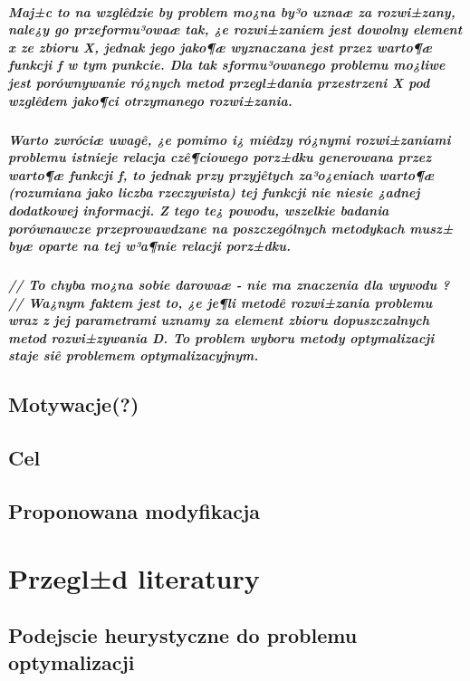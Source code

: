 \documentclass[11pt]{report}
\begin{document}
\paragraph{
Maj±c to na wzglêdzie by problem mo¿na by³o uznaæ za rozwi±zany, nale¿y go przeformu³owaæ tak, ¿e rozwi±zaniem jest dowolny element x ze zbioru X, jednak jego jako¶æ wyznaczana jest przez warto¶æ funkcji f w tym punkcie. Dla tak sformu³owanego problemu mo¿liwe jest porównywanie ró¿nych metod przegl±dania przestrzeni X pod wzglêdem jako¶ci otrzymanego rozwi±zania.
}
\paragraph{
Warto zwróciæ uwagê, ¿e pomimo i¿ miêdzy ró¿nymi rozwi±zaniami problemu istnieje relacja czê¶ciowego porz±dku generowana przez warto¶æ funkcji f, to jednak przy przyjêtych za³o¿eniach warto¶æ (rozumiana jako liczba rzeczywista) tej funkcji nie niesie ¿adnej dodatkowej informacji. Z tego te¿ powodu, wszelkie badania porównawcze przeprowawdzane na poszczególnych metodykach musz± byæ oparte na tej w³a¶nie relacji porz±dku.
}
\paragraph{
// To chyba mo¿na sobie darowaæ - nie ma znaczenia dla wywodu ?
// Wa¿nym faktem jest to, ¿e je¶li metodê rozwi±zania problemu wraz z jej parametrami uznamy za element zbioru dopuszczalnych metod rozwi±zywania D. To problem wyboru metody optymalizacji staje siê problemem optymalizacyjnym.
}

\section{Motywacje(?)}
\section{Cel}
\section{Proponowana modyfikacja} %

\chapter{Przegl±d literatury}
\section{Podejscie heurystyczne do problemu optymalizacji}
\end{document}
